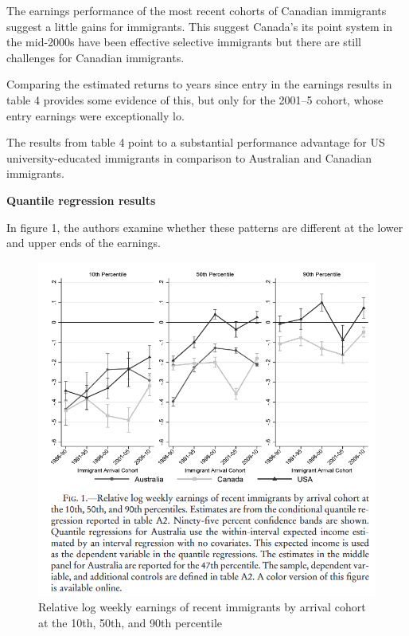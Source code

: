 \documentclass[../root]{subfiles}
\begin{document}
    
    The earnings performance of the most recent cohorts of Canadian  immigrants suggest a little gains for immigrants. This suggest Canada's its point system in the mid-2000s have been effective selective immigrants but there are still challenges for Canadian immigrants.  
    
     Comparing the estimated returns to years since entry in the earnings results in table 4 provides some evidence of this, but only for the 2001–5 cohort, whose entry earnings were exceptionally lo.
    
    The results from table 4 point to a substantial performance advantage for US university-educated immigrants in comparison to Australian and Canadian immigrants. 
    
    {\bf Quantile regression results}
    
    In figure 1, the authors examine whether these patterns are different at the lower and upper ends of the earnings. 
    
    \begin{figure}
        \centering
        \includegraphics[width = \linewidth]{0828sugiyama/Figure_1.png}
        \caption{Relative log weekly earnings of recent immigrants by arrival cohort at the 10th, 50th, and 90th percentile}
        \label{fig:my_label}
    \end{figure}
    
\end{document}
